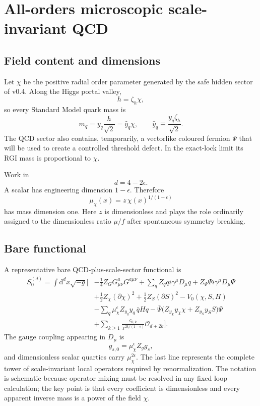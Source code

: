 \documentclass[11pt,a4paper]{article}
\newcommand{\dd}{\mathrm{d}}
\begin{document}
\section{All-orders microscopic scale-invariant QCD}
\label{sec:allorders}

\subsection{Field content and dimensions}

Let $\chi$ be the positive radial order parameter generated by the safe hidden sector of v0.4. Along the Higgs portal valley,
\[
h=\zeta_h\chi,
\]
so every Standard Model quark mass is
\[
m_q=y_q\frac{h}{\sqrt2}
=\widehat y_q\chi,
\qquad
\widehat y_q\equiv\frac{y_q\zeta_h}{\sqrt2}.
\]
The QCD sector also contains, temporarily, a vectorlike coloured fermion $\Psi$ that will be used to create a controlled threshold defect. In the exact-lock limit its RGI mass is proportional to $\chi$.

Work in
\[
d=4-2\epsilon.
\]
A scalar has engineering dimension $1-\epsilon$. Therefore
\[
\boxed{
\mu_\chi(x)=z\,\chi(x)^{1/(1-\epsilon)}
}
\label{eq:muchi}
\]
has mass dimension one. Here $z$ is dimensionless and plays the role ordinarily assigned to the dimensionless ratio $\mu/f$ after spontaneous symmetry breaking.

\subsection{Bare functional}

A representative bare QCD-plus-scale-sector functional is
\begin{align}
S_0^{(d)}=\int\dd^dx\sqrt{-g}\Bigg[&
-\frac14 Z_G G^a_{\mu\nu}G^{a\mu\nu}
+\sum_q Z_q\bar q i\gamma^\mu D_\mu q
+Z_\Psi\bar\Psi i\gamma^\mu D_\mu\Psi
\nonumber\\
&+\frac12Z_\chi(\partial\chi)^2
+\frac12Z_S(\partial S)^2
-V_0(\chi,S,H)
\nonumber\\
&-\sum_q \mu_\chi^\epsilon Z_{y_q}y_q\,\bar qHq
-\bar\Psi\bigl(Z_{y_\chi}y_\chi\chi+Z_{y_S}y_SS\bigr)\Psi
\nonumber\\
&+\sum_{k\ge1}\frac{c_{0,k}}{\chi^{2k/(1-\epsilon)}}
\mathcal O_{d+2k}
\Bigg].
\label{eq:bareaction}
\end{align}
The gauge coupling appearing in $D_\mu$ is
\[
g_{s,0}=\mu_\chi^\epsilon Z_g g_s,
\]
and dimensionless scalar quartics carry $\mu_\chi^{2\epsilon}$. The last line represents the complete tower of scale-invariant local operators required by renormalization. The notation is schematic because operator mixing must be resolved in any fixed loop calculation; the key point is that every coefficient is dimensionless and every apparent inverse mass is a power of the field $\chi$.
\end{document}
